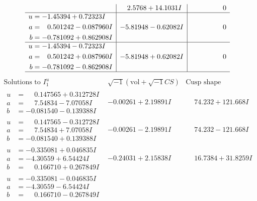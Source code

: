 \documentclass[1p]{elsarticle_modified}
\theoremstyle{definition}
\newcommand{\I}{\sqrt{-1}}
\begin{document}
$$\begin{array}{c|c|c}
 & \phantom{-}2.5768 + 14.1031 I & \phantom{-0.000000 } 0 \\ \hline\begin{aligned}
u &= -1.45394 + 0.72323 I \\
a &= \phantom{-}0.501242 - 0.087960 I \\
b &= -0.781092 + 0.862908 I\end{aligned}
 & -5.81948 - 0.62082 I & \phantom{-0.000000 } 0 \\ \hline\begin{aligned}
u &= -1.45394 - 0.72323 I \\
a &= \phantom{-}0.501242 + 0.087960 I \\
b &= -0.781092 - 0.862908 I\end{aligned}
 & -5.81948 + 0.62082 I & \phantom{-0.000000 } 0\\
 \hline 
 \end{array}$$\newpage$$\begin{array}{c|c|c}  
\text{Solutions to }I^u_{1}& \I (\text{vol} + \sqrt{-1}CS) & \text{Cusp shape}\\
 \hline 
\begin{aligned}
u &= \phantom{-}0.147565 + 0.312728 I \\
a &= \phantom{-}7.54834 - 7.07058 I \\
b &= -0.081540 - 0.139388 I\end{aligned}
 & -0.00261 + 2.19891 I & \phantom{-}74.232 + 121.668 I \\ \hline\begin{aligned}
u &= \phantom{-}0.147565 - 0.312728 I \\
a &= \phantom{-}7.54834 + 7.07058 I \\
b &= -0.081540 + 0.139388 I\end{aligned}
 & -0.00261 - 2.19891 I & \phantom{-}74.232 - 121.668 I \\ \hline\begin{aligned}
u &= -0.335081 + 0.046835 I \\
a &= -4.30559 + 6.54424 I \\
b &= \phantom{-}0.166710 + 0.267849 I\end{aligned}
 & -0.24031 + 2.15838 I & \phantom{-}16.7384 + 31.8259 I \\ \hline\begin{aligned}
u &= -0.335081 - 0.046835 I \\
a &= -4.30559 - 6.54424 I \\
b &= \phantom{-}0.166710 - 0.267849 I\end{aligned}

\end{array}$$
\end{document}
